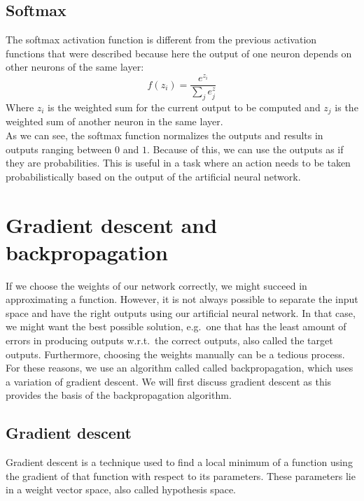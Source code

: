 \subsection{Softmax} %
\label{sub:softmax}
The softmax activation function is different from the previous activation functions that were described because here the output of one neuron depends on other neurons of the same layer:
\begin{equation}
    f(z_i) = \frac{e^{z_i}}{\sum_j e{^z_j}}
\end{equation}
Where $z_i$ is the weighted sum for the current output to be computed and $z_j$ is the weighted sum of another neuron in the same layer.\\
 As we can see, the softmax function normalizes the outputs and results in outputs ranging between $0$ and $1$.
 Because of this, we can use the outputs as if they are probabilities.
 This is useful in a task where an action needs to be taken probabilistically based on the output of the artificial neural network.

\section{Gradient descent and backpropagation} %
\label{sec:gradient_descent_and_backpropagation}
If we choose the weights of our network correctly, we might succeed in approximating a function.
However, it is not always possible to separate the input space and have the right outputs using our artificial neural network.
In that case, we might want the best possible solution, e.g.\ one that has the least amount of errors in producing outputs w.r.t.\ the correct outputs, also called the target outputs.
Furthermore, choosing the weights manually can be a tedious process.\\
For these reasons, we use an algorithm called called backpropagation, which uses a variation of gradient descent.
We will first discuss gradient descent as this provides the basis of the backpropagation algorithm.

\subsection{Gradient descent} %
\label{ssub:gradient_descent}
Gradient descent is a technique used to find a local minimum of a function using the gradient of that function with respect to its parameters. These parameters lie in a weight vector space, also called hypothesis space.

